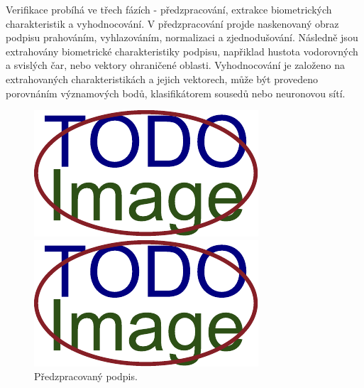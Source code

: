 Verifikace probíhá ve třech fázích - předzpracování, extrakce biometrických charakteristik a vyhodnocování. %
V předzpracování projde naskenovaný obraz podpisu prahováním, vyhlazováním, normalizaci a zjednodušování.   %
Následně jsou extrahovány biometrické charakteristiky podpisu,                                              %
napřiklad hustota vodorovných a svislých čar, nebo vektory ohraničené oblasti.                              %
Vyhodnocování je založeno na extrahovaných charakteristikách a jejich vektorech,                            %
může být provedeno porovnáním významových bodů, klasifikátorem sousedů nebo neuronovou sítí.                %

\begin{figure}[h]
  \centering
  \begin{minipage}{0.3\textwidth}
      \centering
      \includegraphics[width=\textwidth]{obrazky-figures/placeholder.pdf}
      \caption{Předzpracovaný podpis.}
      \label{fig:first-image}
  \end{minipage}\hfill
  \begin{minipage}{0.3\textwidth}
      \centering
      \includegraphics[width=\textwidth]{obrazky-figures/placeholder.pdf}

\end{minipage}
\end{figure}
